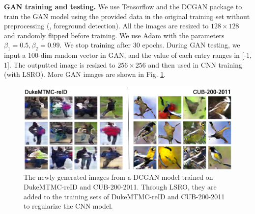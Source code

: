 \documentclass[10pt,twocolumn,letterpaper]{article}
\begin{document}
\textbf{GAN training and testing.} We use Tensorflow \cite{abadi2016tensorflow} and the DCGAN package \cite{DCGAN-tensorflow} to train the GAN model using the provided data in the original training set without preprocessing (\eg, foreground detection). All the images are resized to $128\times128$ and randomly flipped before training. We use Adam \cite{kingma2014adam} with the parameters $\beta_1=0.5, \beta_2=0.99$. We stop training after 30 epochs. During GAN testing, we input a 100-dim random vector in GAN, and the value of each entry ranges in [-1, 1]. The outputted image is resized to $256\times256$ and then used in CNN training (with LSRO). More GAN images are shown in Fig. \ref{fig:gan}.


\begin{figure}
\begin{center}
   \includegraphics[width=1\linewidth]{gan_duke_cub.eps}
\end{center}
   \caption{The newly generated images from a DCGAN model trained on DukeMTMC-reID and CUB-200-2011. Through LSRO, they are added to the training sets of DukeMTMC-reID and CUB-200-2011 to regularize the CNN model.}
\label{fig:gan}
\end{figure} 
\end{document}
